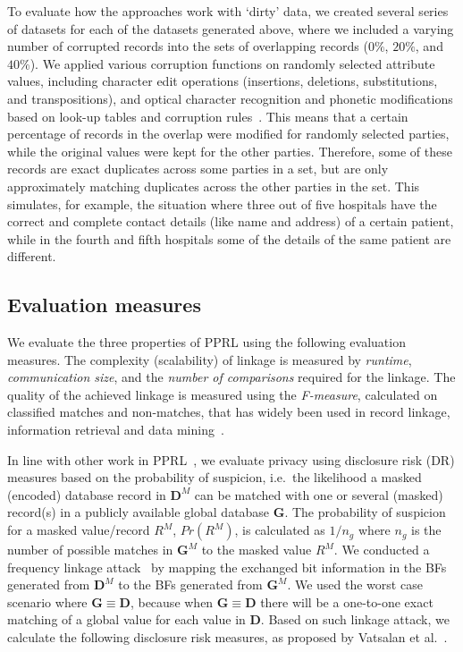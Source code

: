 \documentclass{sig-alternate}
\begin{document}
To evaluate how the approaches work with `dirty' data, 
we created several series of datasets for each of the
datasets generated above, 
where we included a varying number
of corrupted records into the sets of overlapping records ($0\%$,
$20\%$, and $40\%$). 
We applied various corruption
functions on randomly selected attribute values, 
including character edit operations (insertions, deletions,
substitutions, and transpositions), and optical character recognition
and phonetic modifications based on look-up tables and corruption
rules~\cite{Chr13b}.
This means that a certain
percentage of records in the overlap were modified for randomly
selected parties, while the original values were kept for the
other parties. Therefore,
some of these records are exact duplicates across some parties in a
set, but are only approximately matching duplicates across the other
parties in the set. This simulates, for example, the situation where
three out of five hospitals have the correct and complete contact
details (like name and address) of a certain patient, while in the
fourth and fifth hospitals some of the details of the same patient are
different.

\subsection{Evaluation measures}
\label{sec-measures}

We evaluate the three properties of PPRL 
using the
following evaluation measures.
The complexity (scalability) of linkage is measured by \emph{runtime}, 
\emph{communication size}, and the
\emph{number of comparisons} required for the linkage. 
The quality of the achieved linkage is measured using the 
\emph{F-measure}, calculated on classified matches and non-matches,
that has widely been used in record linkage,
information retrieval and data mining~\cite{Chr12}.

In line with other work in PPRL~\cite{Ran14,Vat14c,Vat16c,Vat14}, we
evaluate privacy using disclosure risk (DR) measures based on the
probability of suspicion, i.e.\ the likelihood a masked (encoded) database
record in $\mathbf{D}^M$ can be matched with one or several (masked) record(s) in a
publicly available global database $\mathbf{G}$. 
The probability of suspicion for a masked value/record $R^M$, $Pr(R^M)$,
is calculated as $1/n_g$ where
$n_g$ is the number of possible matches in $\mathbf{G}^M$
to the masked value $R^M$.
We conducted a frequency linkage attack~\cite{Vat14} 
by mapping the exchanged bit information in the BFs
generated from $\mathbf{D}^M$
to the BFs generated from $\mathbf{G}^M$.
We used the worst case scenario where $\mathbf{G} \equiv \mathbf{D}$,
because when
$\mathbf{G} \equiv \mathbf{D}$ there will be a one-to-one exact matching
of a global value for each value in $\mathbf{D}$.
Based on such linkage attack, we
calculate the
following disclosure risk measures, as proposed by Vatsalan et al.~\cite{Vat14}.
\end{document}
